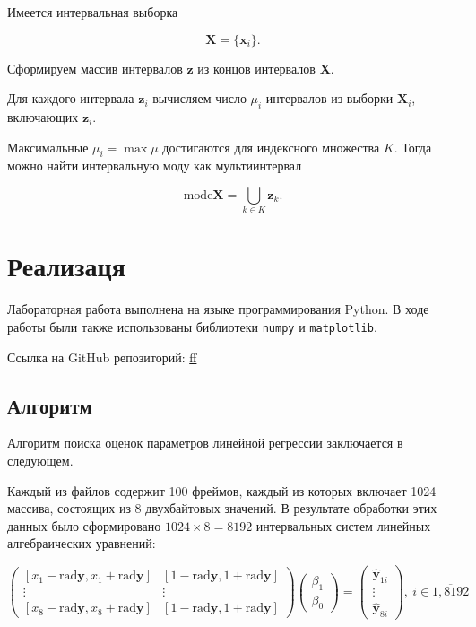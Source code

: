 \documentclass{article}
\begin{document}
  Имеется интервальная выборка

  \[
    \mathbf{X} = \{ \mathbf{x}_i \}.
  \]

  Сформируем массив интервалов \( \mathbf{z} \) из концов интервалов
  \( \mathbf{X} \).

  Для каждого интервала \( \mathbf{z}_i \) вычисляем число \( \mu_i \)
  интервалов из выборки \( \mathbf{X}_i \), включающих \( \mathbf{z}_i \).

  Максимальные \( \mu_i = \max \mu \) достигаются для индексного множества
  \( K \). Тогда можно найти интервальную моду как мультиинтервал

  \begin{equation}
    \text{mode} \mathbf{X} = \bigcup_{k \in K} \mathbf{z}_k.
  \end{equation}

  \section{Реализаця}

  Лабораторная работа выполнена на языке программирования Python. В ходе
  работы были также использованы библиотеки \verb!numpy! и
  \verb!matplotlib!.


  Ссылка на GitHub репозиторий:
  \url{ff}

  \subsection{Алгоритм}
  Алгоритм поиска оценок параметров линейной регрессии заключается в следующем.

  Каждый из файлов содержит 100 фреймов, каждый из которых включает
  1024 массива, состоящих из 8 двухбайтовых значений. В результате
  обработки этих данных было сформировано \( 1024 \times 8 = 8192 \)
  интервальных систем линейных алгебраических уравнений: 

  \[
    \begin{pmatrix}
    [x_1 - \text{rad} \mathbf{y}, x_1 + \text{rad} \mathbf{y}] &
    [1 - \text{rad} \mathbf{y}, 1 + \text{rad} \mathbf{y}] \\
    \vdots & \vdots \\
    [x_8 - \text{rad} \mathbf{y}, x_8 + \text{rad} \mathbf{y}] &
    [1 - \text{rad} \mathbf{y}, 1 + \text{rad} \mathbf{y}]
    \end{pmatrix}
    \begin{pmatrix}
    \beta_1 \\
    \beta_0
    \end{pmatrix}
    = \begin{pmatrix}
    \hat{\mathbf{y}}_{1i} \\
    \vdots \\
    \hat{\mathbf{y}}_{8i}
    \end{pmatrix}, \ i \in \overline{1,8192}
  \]
\end{document}
